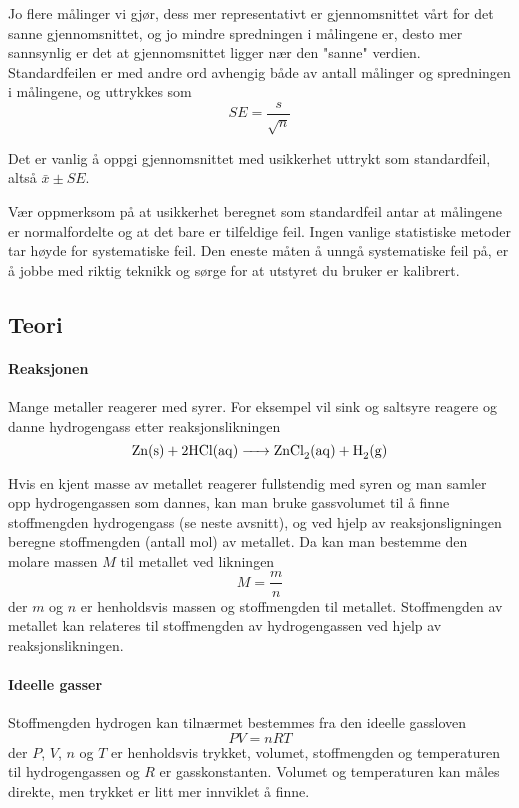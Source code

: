 \documentclass[12pt, a4]{article}
\begin{document}
	Jo flere målinger vi gjør, dess mer representativt er gjennomsnittet vårt for det sanne gjennomsnittet, og jo mindre spredningen i målingene er, desto mer sannsynlig er det at gjennomsnittet ligger nær den "sanne" verdien. Standardfeilen er med andre ord avhengig både av antall målinger og spredningen i målingene, og uttrykkes som 
	\begin{equation}
	SE =\frac{s}{\sqrt{n}}
	\end{equation}
	
	Det er vanlig å oppgi gjennomsnittet med usikkerhet uttrykt som standardfeil, altså $\bar{x}\pm SE$.
	
	
	Vær oppmerksom på at usikkerhet beregnet som standardfeil antar at målingene er normalfordelte og at det bare er tilfeldige feil. Ingen vanlige statistiske metoder tar høyde for systematiske feil. Den eneste måten å unngå systematiske feil på, er å jobbe med riktig teknikk og sørge for at utstyret du bruker er kalibrert.
	
	
	\subsection{Teori}
	\paragraph{Reaksjonen}
	Mange metaller reagerer med syrer. For eksempel vil sink og saltsyre reagere og danne hydrogengass etter reaksjonslikningen
	\begin{equation*}
	\ce{Zn (s) + 2 HCl (aq) -> ZnCl2 (aq) + H2 (g)}    
	\end{equation*}
	
	Hvis en kjent masse av metallet reagerer fullstendig med syren og man samler opp hydrogengassen som dannes, kan man bruke gassvolumet til å finne stoffmengden hydrogengass (se neste avsnitt), og ved hjelp av reaksjonsligningen beregne stoffmengden (antall mol) av metallet. Da kan man bestemme den molare massen $M$ til metallet ved likningen
	\begin{equation}
	M = \frac{m}{n}
	\end{equation}
	der $m$ og $n$ er henholdsvis massen og stoffmengden til metallet. Stoffmengden av metallet kan relateres til stoffmengden av hydrogengassen ved hjelp av reaksjonslikningen. 
	
	\paragraph{Ideelle gasser}
	Stoffmengden hydrogen kan tilnærmet bestemmes fra den ideelle gassloven
	\begin{equation}
	PV = nRT
	\end{equation}
	der $P$, $V$, $n$ og $T$ er henholdsvis trykket, volumet, stoffmengden og temperaturen til hydrogengassen og $R$ er gasskonstanten. Volumet og temperaturen kan måles direkte, men trykket er litt mer innviklet å finne. 
	
\end{document}
